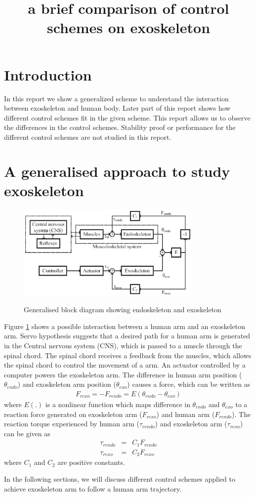 \documentclass{article}
\title{a brief comparison of control schemes on exoskeleton}
\author{}
\begin{document}
\maketitle
\section{Introduction}
In this report we show a generalized scheme to understand the interaction between exoskeleton and human body. Later part of this report shows how different control schemes fit in the given scheme. This report allows us to observe the differences in the control schemes. Stability proof or performance for the different control schemes are not studied in this report.
\section{A generalised approach to study exoskeleton}
\begin{figure}
  \centering
  \includegraphics[width=09cm]{images/General_BD.eps}\\
  \caption{Generalised block diagram showing endoskeleton and exoskeleton}\label{Fig:General_BD}
\end{figure}
Figure \ref{Fig:General_BD} shows a possible interaction between a human arm and an exoskeleton arm. Servo hypothesis suggests that a desired path for a human arm is generated in the Central nervous system (CNS),  which is passed to a muscle through the spinal chord. The spinal chord receives a feedback from the muscles, which allows the spinal chord to control the movement of a arm. An actuator controlled by a computer powers the exoskeleton arm. The difference in human arm position ($\theta_{endo}$) and exoskeleton arm position ($\theta_{exo}$) causes a force, which can be written as
\begin{eqnarray}
    F_{rexo} = - F_{rendo} = E(\theta_{endo}-\theta_{exo}) \label{Eqn:Reaction_Force}
\end{eqnarray}
where $E(.)$ is a nonlinear function which maps difference in $\theta_{endo}$ and $\theta_{exo}$ to a reaction force generated on exoskeleton arm ($F_{rexo}$) and human arm ($F_{rendo}$). The reaction torque experienced by human arm ($\tau_{rendo}$) and exoskeleton arm ($\tau_{rexo}$) can be given as
\begin{eqnarray}
    \tau_{rendo} &=& C_1F_{rendo} \label{Eqn:taurendo} \\
    \tau_{rexo} &=& C_2F_{rexo} \label{Eqn:taurexo}
\end{eqnarray}
where $C_1$ and $C_2$ are positive constants.
\par
In the following sections, we will discuss different control schemes applied to achieve exoskeleton arm to follow a human arm trajectory.
\end{document}
